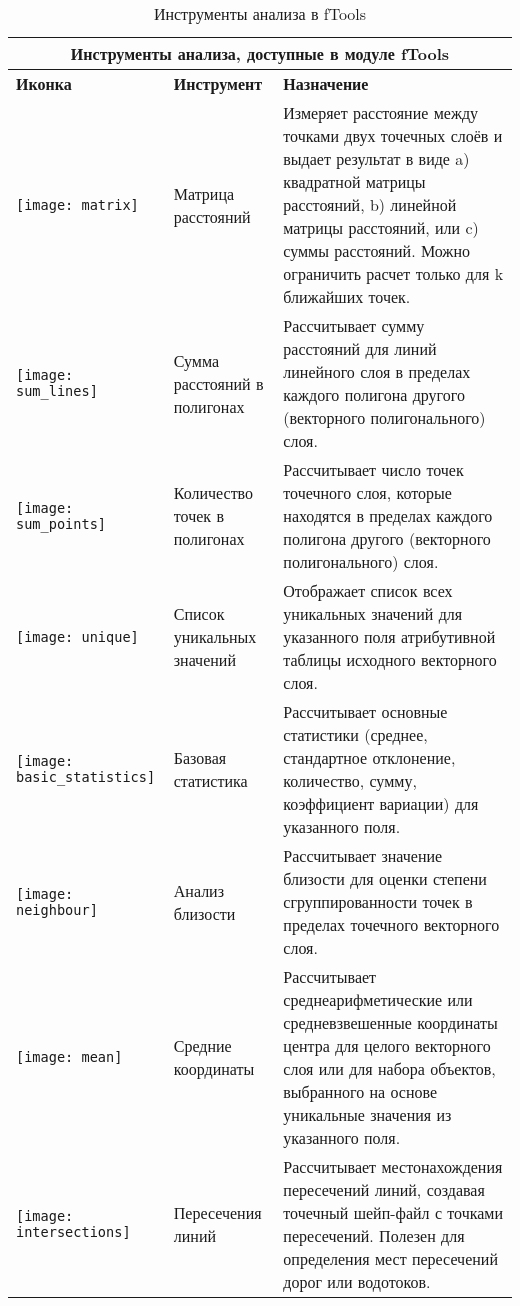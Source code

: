 \begin{table}[ht]
\centering
 \begin{tabular}{|m{1cm}|m{4cm}|m{9cm}|}
\hline \multicolumn{3}{|c|}{\textbf{Инструменты анализа, доступные в  модуле fTools}} \\
 \hline \textbf{Иконка} & \textbf{Инструмент} & \textbf{Назначение} \\
 \hline \texttt{[image: matrix]} & Матрица расстояний &
 Измеряет расстояние между точками двух точечных слоёв и выдает результат в виде
 a) квадратной матрицы расстояний, b) линейной матрицы расстояний, или c) суммы расстояний.
 Можно ограничить расчет только для k ближайших точек. \\
 \hline \texttt{[image: sum\_lines]} & Сумма расстояний в полигонах & Рассчитывает
 сумму расстояний для линий линейного слоя в пределах каждого полигона другого
 (векторного полигонального) слоя. \\
 \hline \texttt{[image: sum\_points]} & Количество точек в полигонах & Рассчитывает
 число точек точечного слоя, которые находятся в пределах каждого полигона другого
 (векторного полигонального) слоя. \\
 \hline \texttt{[image: unique]} & Список уникальных значений & Отображает
 список всех уникальных значений для указанного поля атрибутивной таблицы
 исходного векторного слоя. \\
 \hline \texttt{[image: basic\_statistics]} & Базовая статистика & Рассчитывает
 основные статистики (среднее, стандартное отклонение, количество,
 сумму, коэффициент вариации) для указанного поля. \\
 \hline \texttt{[image: neighbour]} & Анализ близости
 & Рассчитывает значение близости для оценки степени сгруппированности точек
 в пределах точечного векторного слоя. \\
 \hline \texttt{[image: mean]} & Средние координаты &
 Рассчитывает среднеарифметические или средневзвешенные координаты центра для целого векторного слоя
 или для набора объектов, выбранного на основе уникальные значения из указанного поля. \\
 \hline \texttt{[image: intersections]} & Пересечения линий &
 Рассчитывает местонахождения пересечений линий, создавая точечный шейп-файл с точками пересечений.
 Полезен для определения мест пересечений дорог или водотоков. \\
 \hline
\end{tabular}
\caption{Инструменты анализа в fTools}\label{tab:ftool_analysis}
\end{table}

